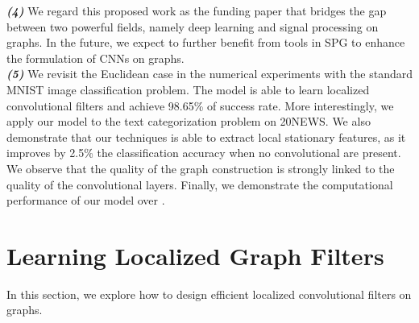 \documentclass{article}
\begin{document}
{\textbf {\textit {(4)}}} We regard this proposed work as the funding paper that bridges the gap between two powerful fields, namely deep learning and signal processing on graphs. In the future, we expect to further benefit from tools in SPG to enhance the formulation of CNNs on graphs. \\
{\textbf {\textit {(5)}}} We revisit the Euclidean case in the numerical experiments with the standard MNIST image classification problem. The model is able to learn localized convolutional filters and achieve 98.65\% of success rate. More interestingly, we apply our model to the text categorization problem on 20NEWS. We also demonstrate that our techniques is able to extract local stationary features, as it improves by 2.5\% the classification accuracy when no convolutional are present. We observe that the quality of the graph construction is strongly linked to the quality of the convolutional layers. Finally, we demonstrate the computational performance of our model over \cite{art:HenaffBrunaLeCun15DLgraphs}.



\section{Learning Localized Graph Filters}
\vspace{-0.2cm}
In this section, we explore how to design efficient localized convolutional filters on graphs.
\end{document}
